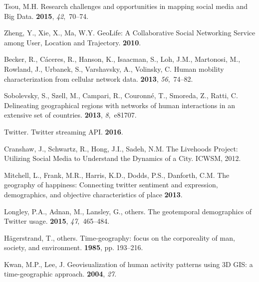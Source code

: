 \documentclass{elsart}
\begin{document}
\begin{thebibliography}{00}
Tsou, M.H.
\newblock Research challenges and opportunities in mapping social media and Big
  Data.
 {\bf 2015}, {\em
  42},~70--74.

Zheng, Y., Xie, X., Ma, W.Y.
\newblock GeoLife: A Collaborative Social Networking Service among User,
  Location and Trajectory. {\bf 2010}.

Becker, R., C{\'a}ceres, R., Hanson, K., Isaacman, S., Loh, J.M., Martonosi,
  M., Rowland, J., Urbanek, S., Varshavsky, A., Volinsky, C.
\newblock Human mobility characterization from cellular network data.
 {\bf 2013}, {\em 56},~74--82.

Sobolevsky, S., Szell, M., Campari, R., Couronn{\'e}, T., Smoreda, Z., Ratti,
  C.
\newblock Delineating geographical regions with networks of human interactions
  in an extensive set of countries.
 {\bf 2013}, {\em 8},~e81707.

Twitter.
\newblock Twitter streaming API.
 {\bf
  2016}.

Cranshaw, J., Schwartz, R., Hong, J.I., Sadeh, N.M.
\newblock The Livehoods Project: Utilizing Social Media to Understand the
  Dynamics of a City.
\newblock  ICWSM,  2012.

Mitchell, L., Frank, M.R., Harris, K.D., Dodds, P.S., Danforth, C.M.
\newblock The geography of happiness: Connecting twitter sentiment and
  expression, demographics, and objective characteristics of place {\bf 2013}.

Longley, P.A., Adnan, M., Lansley, G., others.
\newblock The geotemporal demographics of Twitter usage.
 {\bf 2015}, {\em 47},~465--484.

H{\"a}gerstrand, T., others.
\newblock Time-geography: focus on the corporeality of man, society, and
  environment.
 {\bf 1985}, pp. 193--216.

Kwan, M.P., Lee, J.
\newblock Geovisualization of human activity patterns using 3D GIS: a
  time-geographic approach.
 {\bf 2004}, {\em 27}.


\end{thebibliography}
\end{document}
